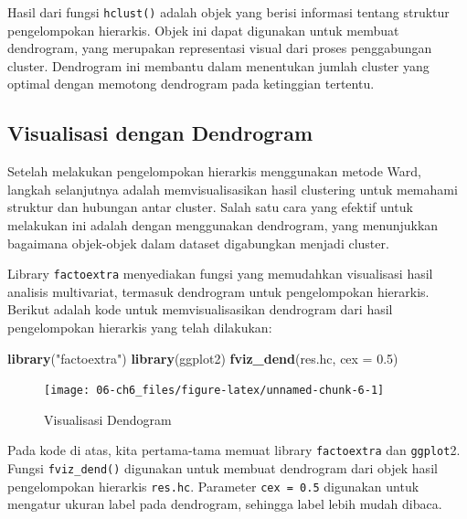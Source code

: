 \documentclass[
  oneside]{book}
\newenvironment{Shaded}{\begin{snugshade}}{\end{snugshade}}
\newcommand{\AttributeTok}[1]{\textcolor[rgb]{0.13,0.29,0.53}{#1}}
\newcommand{\FloatTok}[1]{\textcolor[rgb]{0.00,0.00,0.81}{#1}}
\newcommand{\FunctionTok}[1]{\textcolor[rgb]{0.13,0.29,0.53}{\textbf{#1}}}
\newcommand{\NormalTok}[1]{#1}
\newcommand{\StringTok}[1]{\textcolor[rgb]{0.31,0.60,0.02}{#1}}
\begin{document}
Hasil dari fungsi \texttt{hclust()} adalah objek yang berisi informasi tentang struktur pengelompokan hierarkis. Objek ini dapat digunakan untuk membuat dendrogram, yang merupakan representasi visual dari proses penggabungan cluster. Dendrogram ini membantu dalam menentukan jumlah cluster yang optimal dengan memotong dendrogram pada ketinggian tertentu.

\subsection*{Visualisasi dengan Dendrogram}\label{visualisasi-dengan-dendrogram}

Setelah melakukan pengelompokan hierarkis menggunakan metode Ward, langkah selanjutnya adalah memvisualisasikan hasil clustering untuk memahami struktur dan hubungan antar cluster. Salah satu cara yang efektif untuk melakukan ini adalah dengan menggunakan dendrogram, yang menunjukkan bagaimana objek-objek dalam dataset digabungkan menjadi cluster.

Library \texttt{factoextra} menyediakan fungsi yang memudahkan visualisasi hasil analisis multivariat, termasuk dendrogram untuk pengelompokan hierarkis. Berikut adalah kode untuk memvisualisasikan dendrogram dari hasil pengelompokan hierarkis yang telah dilakukan:

\begin{Shaded}
\begin{Highlighting}[]
\FunctionTok{library}\NormalTok{(}\StringTok{"factoextra"}\NormalTok{)}
\FunctionTok{library}\NormalTok{(ggplot2)}
\FunctionTok{fviz\_dend}\NormalTok{(res.hc, }\AttributeTok{cex =} \FloatTok{0.5}\NormalTok{)}
\end{Highlighting}
\end{Shaded}

\begin{figure}[h]

{\centering \texttt{[image: 06-ch6\_files/figure-latex/unnamed-chunk-6-1]} 

}

\caption{Visualisasi Dendogram}\label{fig:unnamed-chunk-6}
\end{figure}

Pada kode di atas, kita pertama-tama memuat library \texttt{factoextra} dan \texttt{ggplot}2. Fungsi \texttt{fviz\_dend()} digunakan untuk membuat dendrogram dari objek hasil pengelompokan hierarkis \texttt{res.hc}. Parameter \texttt{cex\ =\ 0.5} digunakan untuk mengatur ukuran label pada dendrogram, sehingga label lebih mudah dibaca.
\end{document}
